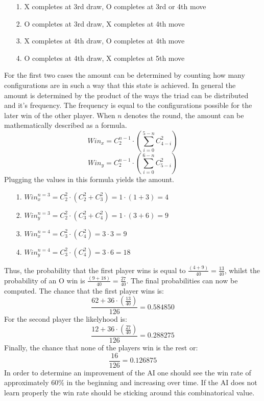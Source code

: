 \documentclass[12pt]{article}
\begin{document}
\begin{itemize}
    \item [1.]{X completes at 3rd draw, O completes at 3rd or 4th move}
    \item [2.]{O completes at 3rd draw, X completes at 4th move}
    \item [3.]{X completes at 4th draw, O completes at 4th move}
    \item [4.]{O completes at 4th draw, X completes at 5th move}
\end{itemize}
For the first two cases the amount can be determined by counting how many configurations are in such a way that this \gls{state} is achieved. In general the amount is determined by the product of the ways the triad can be distributed and it's frequency. The frequency is equal to the configurations possible for the later win of the other player. When $n$ denotes the round, the amount can be mathematically described as a formula.
\begin{equation}
   Win_{x} = C_{2}^{n-1} \cdot \left ( \sum _{i = 0}^{5 - n} C_{4-i}^{2} \right )
 \end{equation}
 \begin{equation}
      Win_{y} = C_{2}^{n-1} \cdot \left ( \sum _{i = 0}^{6 - n} C_{5-i}^{2} \right )
\end{equation}
Plugging the values in this formula yields the amount.
\begin{itemize}
    \item [1.]{$ Win_{x}^{n=3} = C_{2}^{2} \cdot \left ( C_{2}^{2} + C_{3}^{2}  \right ) = 1 \cdot (1+3) = 4$}
    \item [2.]{ $Win_{y}^{n=3} = C_{2}^{2} \cdot \left ( C_{3}^{2} + C_{4}^{2}  \right ) = 1 \cdot (3+6) = 9$}
    \item [3.]{$   Win_{x}^{n=4} = C_{3}^{2} \cdot \left ( C_{4}^{2} \right ) = 3 \cdot 3 = 9$}
    \item [4.]{$   Win_{y}^{n=4} = C_{3}^{2} \cdot \left ( C_{4}^{2} \right ) = 3 \cdot 6 = 18$}
\end{itemize}
Thus, the probability that the first player wins is equal to $\frac{(4+9)}{40} = \frac{13}{40}$, whilst the probability of an O win is $\frac{(9+18)}{40} = \frac{27}{40}$.
The final probabilities can now be computed. The chance that the first player wins is:
\begin{equation}\nonumber
 \frac{62 + 36 \cdot \left ( \frac{13}{40} \right ) }{126} =  0.584850 
\end{equation}
For the second player the likelyhood is:
\begin{equation}\nonumber
 \frac{12 + 36 \cdot \left ( \frac{27}{40} \right ) }{126} =  0.288275 
\end{equation}
Finally, the chance that none of the players win is the rest or:
\begin{equation}\nonumber
\frac{16}{126} = 0.126875
\end{equation}
In order to determine an improvement of the \gls{AI} one should see the win rate of approximately $ 60\% $ in the beginning and increasing over time. If the \gls{AI} does not learn properly the win rate should be sticking around this combinatorical value.
\end{document}
